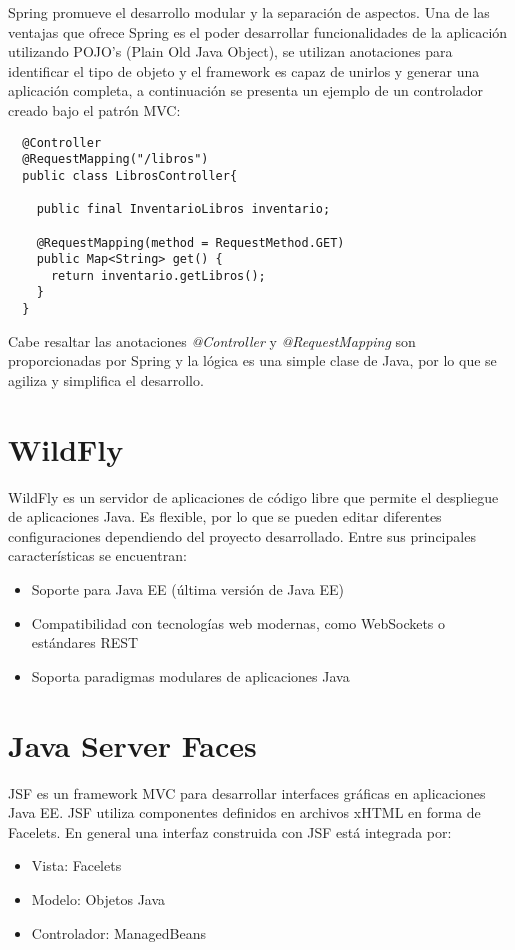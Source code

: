Spring promueve el desarrollo modular y la separación de aspectos.
Una de las ventajas que ofrece Spring es el poder desarrollar funcionalidades de la aplicación utilizando POJO's (Plain Old Java Object), se utilizan anotaciones para identificar el tipo de objeto y el framework es capaz de unirlos y generar una aplicación completa, a continuación se presenta un ejemplo de un controlador creado bajo el patrón MVC: 

\begin{lstlisting}
  @Controller
  @RequestMapping("/libros")
  public class LibrosController{
  
  	public final InventarioLibros inventario;
  	
  	@RequestMapping(method = RequestMethod.GET)
  	public Map<String> get() {
  	  return inventario.getLibros(); 
  	}
  }
\end{lstlisting}

Cabe resaltar las anotaciones \textit{@Controller} y \textit{@RequestMapping} son proporcionadas por Spring y la lógica es una simple clase de Java, por lo que se agiliza y simplifica el desarrollo.

\section{WildFly}
WildFly es un servidor de aplicaciones de código libre que permite el despliegue de aplicaciones Java.
Es flexible, por lo que se pueden editar diferentes configuraciones dependiendo del proyecto desarrollado.
Entre sus principales características se encuentran:
\begin{itemize}
  \item Soporte para Java EE (última versión de Java EE)
  \item Compatibilidad con tecnologías web modernas, como WebSockets o estándares REST
  \item Soporta paradigmas modulares de aplicaciones Java
\end{itemize} 

\section{Java Server Faces}
JSF es un framework MVC para desarrollar interfaces gráficas en aplicaciones Java EE.
JSF utiliza componentes definidos en archivos xHTML en forma de Facelets.
En general una interfaz construida con JSF está integrada por:
\begin{itemize}
  \item Vista: Facelets
  \item Modelo: Objetos Java
  \item Controlador: ManagedBeans
\end{itemize} 

